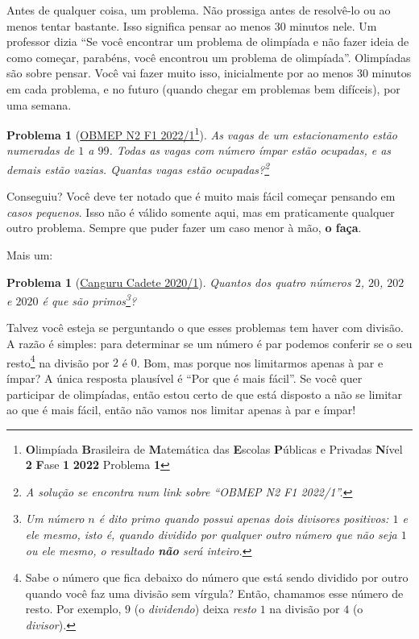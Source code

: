 \documentclass{article}
\newcommand{\q}[1]{``#1''}
\newtheorem{problem}[theorem]{Problema}
\begin{document}
Antes de qualquer coisa, um problema. Não prossiga antes de resolvê-lo ou ao menos tentar bastante. Isso significa pensar ao menos 30 minutos nele. Um professor dizia \q{Se você encontrar um problema de olimpíada e não fazer ideia de como começar, parabéns, você encontrou um problema de olimpíada}. Olimpíadas são sobre pensar. Você vai fazer muito isso, inicialmente por ao menos 30 minutos em cada problema, e no futuro (quando chegar em problemas bem difíceis), por uma semana.

\begin{problem}[\href{https://drive.google.com/file/d/1nLw_ak5QO8c5qKCGiEK7El-s1BBm6e1w/view}{OBMEP N2 F1 2022/1}\footnote{\textbf{O}limpíada \textbf{B}rasileira de \textbf{M}atemática das \textbf{E}scolas \textbf{P}úblicas e Privadas \textbf{N}ível \textbf{2} \textbf{F}ase \textbf{1} \textbf{2022} Problema \textbf{1}}]
As vagas de um estacionamento estão numeradas de $1$ a $99$. Todas as vagas com número ímpar estão ocupadas, e as demais estão vazias. Quantas vagas estão ocupadas?\footnote{A solução se encontra num link sobre \q{OBMEP N2 F1 2022/1}.}
\end{problem}

Conseguiu? Você deve ter notado que é muito mais fácil começar pensando em \textit{casos pequenos}. Isso não é válido somente aqui, mas em praticamente qualquer outro problema. Sempre que puder fazer um caso menor à mão, \textbf{o faça}.

Mais um:

\begin{problem}[\href{https://www.youtube.com/watch?v=Fokbzx_vYfo}{Canguru Cadete 2020/1}]
Quantos dos quatro números $2$, $20$, $202$ e $2020$ é que são primos\footnote{Um número $n$ é dito primo quando possui apenas dois divisores positivos: $1$ e ele mesmo, isto é, quando dividido por qualquer outro número que não seja $1$ ou ele mesmo, o resultado \textbf{não} será inteiro.}?
\end{problem}

Talvez você esteja se perguntando o que esses problemas tem haver com divisão. A razão é simples: para determinar se um número é par podemos conferir se o seu resto\footnote{Sabe o número que fica debaixo do número que está sendo dividido por outro quando você faz uma divisão sem vírgula? Então, chamamos esse número de resto. Por exemplo, $9$ (o \textit{dividendo}) deixa \textit{resto} $1$ na divisão por $4$ (o \textit{divisor}).} na divisão por $2$ é $0$. Bom, mas porque nos limitarmos apenas à par e ímpar? A única resposta plausível é \q{Por que é mais fácil}. Se você quer participar de olimpíadas, então estou certo de que está disposto a não se limitar ao que é mais fácil, então não vamos nos limitar apenas à par e ímpar!
\end{document}
